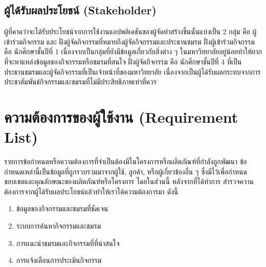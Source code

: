 \documentclass[14pt,oneside,openright,a4paper]{cpe-thai-project}
\begin{document}
\subsection{ผู้ได้รับผลประโยชน์ (Stakeholder)}
  ผู้ที่คาดว่าจะได้รับประโยชน์จากการใช้งานแอปพลิเคชันของผู้จัดทำสร้างขึ้นนั้นแบ่งเป็น 2 กลุ่ม คือ ผู้เข้าร่วมกิจกรรม และ ฝั่งผู้จัดกิจกรรมที่หมายถึงผู้จัดกิจกรรมและประธานชมรม
  ฝั่งผู้เข้าร่วมกิจกรรม คือ นักศึกษาชั้นปีที่ 1 เนื่องจากเป็นกลุ่มที่ยังมีข้อมูลเกี่ยวกับสิ่งต่าง ๆ ในมหาวิทยาลัยอยู่น้อยทำให้ยากที่จะหาแหล่งข้อมูลของกิจกรรมหรือชมรมที่สนใจ
  ฝั่งผู้จัดกิจกรรม คือ นักศึกษาชั้นปีที่ 4 ที่เป็นประธานชมรมและผู้จัดกิจกรรมที่เป็นเจ้าหน้าที่ของมหาวิทยาลัย เนื่องจากเป็นผู้ได้รับผลกระทบจากการประชาสัมพันธ์กิจกรรมและชมรมที่ไม่มีประสิทธิภาพเท่าที่ควร

\section{ความต้องการของผู้ใช้งาน (Requirement List)}
  รายการข้อกำหนดหรือความต้องการที่จำเป็นต้องมีในโครงการหรือผลิตภัณฑ์ที่กำลังถูกพัฒนา ข้อกำหนดเหล่านี้เป็นข้อมูลที่ถูกรวบรวมมาจากผู้ใช้, ลูกค้า, หรือผู้เกี่ยวข้องอื่น ๆ ซึ่งมีไว้เพื่อกำหนดขอบเขตและคุณลักษณะของผลิตภัณฑ์หรือโครงการ โดยในส่วนนี้ หลังจากที่ได้ทำการ สำรวจความต้องการจากผู้ได้รับผลประโยชน์แล้วทำให้เราได้ความต้องการมา ดังนี้ \\

\begin{enumerate}
  \item ข้อมูลของกิจกรรมและชมรมที่ชัดเจน
  \item ระบบการค้นหากิจกรรมและชมรม
  \item การแนะนำชมรมและกิจกรรมที่ที่น่าสนใจ
  \item การแจ้งเตือนการประเมินกิจกรรม
\end{enumerate}
\end{document}
